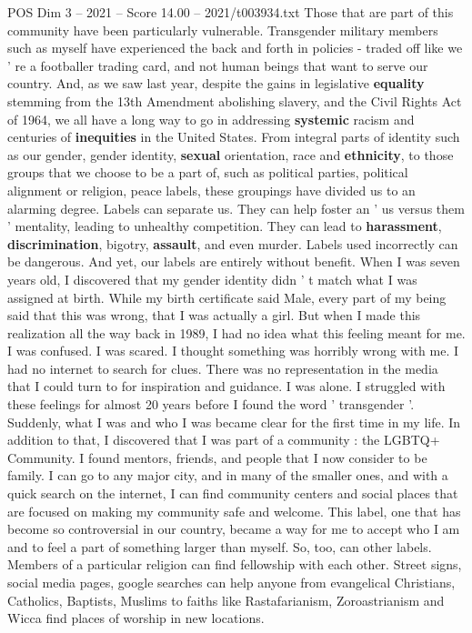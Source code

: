 \begin{textsample}{POS Dim 3 – 2021 – Score 14.00 – 2021/t003934.txt}
Those that are part of this community have been particularly vulnerable.
Transgender military members such as myself have experienced the back and forth in policies - traded off like we ' re a footballer trading card, and not human beings that want to serve our country.
And, as we saw last year, despite the gains in legislative \textbf{equality} stemming from the 13th Amendment abolishing slavery, and the Civil Rights Act of 1964, we all have a long way to go in addressing \textbf{systemic} racism and centuries of \textbf{inequities} in the United States.
From integral parts of identity such as our gender, gender identity, \textbf{sexual} orientation, race and \textbf{ethnicity}, to those groups that we choose to be a part of, such as political parties, political alignment or religion, peace labels, these groupings have divided us to an alarming degree.
Labels can separate us.
They can help foster an ' us versus them ' mentality, leading to unhealthy competition.
They can lead to \textbf{harassment}, \textbf{discrimination}, bigotry, \textbf{assault}, and even murder.
Labels used incorrectly can be dangerous.
And yet, our labels are entirely without benefit.
When I was seven years old, I discovered that my gender identity didn ' t match what I was assigned at birth.
While my birth certificate said Male, every part of my being said that this was wrong, that I was actually a girl.
But when I made this realization all the way back in 1989, I had no idea what this feeling meant for me.
I was confused.
I was scared.
I thought something was horribly wrong with me.
I had no internet to search for clues.
There was no representation in the media that I could turn to for inspiration and guidance.
I was alone.
I struggled with these feelings for almost 20 years before I found the word ' transgender '.
Suddenly, what I was and who I was became clear for the first time in my life.
In addition to that, I discovered that I was part of a community : the LGBTQ+ Community.
I found mentors, friends, and people that I now consider to be family.
I can go to any major city, and in many of the smaller ones, and with a quick search on the internet, I can find community centers and social places that are focused on making my community safe and welcome.
This label, one that has become so controversial in our country, became a way for me to accept who I am and to feel a part of something larger than myself.
So, too, can other labels.
Members of a particular religion can find fellowship with each other.
Street signs, social media pages, google searches can help anyone from evangelical Christians, Catholics, Baptists, Muslims to faiths like Rastafarianism, Zoroastrianism and Wicca find places of worship in new locations.

\end{textsample}
